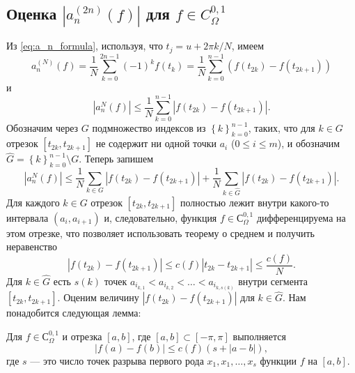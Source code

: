 \subsection{Оценка $|a_{n}^{(2n)}(f)|$ для $f \in C^{0,1}_\Omega$}
Из \eqref{eq:a_n_formula}, используя, что $t_j=u+2\pi k / N$, имеем
\begin{equation*}
a_{n}^{(N)}(f) = \frac{1}{N} \sum_{k=0}^{2n-1} (-1)^k f(t_k)  =
\frac{1}{N} \sum_{k=0}^{n-1} \left(f(t_{2k}) - f(t_{2k+1})\right)
\end{equation*}
и
\begin{equation*}
\left|a_{n}^{N}(f)\right| \leq \frac{1}{N} \sum_{k=0}^{n-1} \left| f(t_{2k}) - f(t_{2k+1}) \right|.
\end{equation*}
Обозначим через $G$ подмножество индексов из $\left\{k\right\}_{k=0}^{n-1}$, таких, что для $k \in G$ отрезок $[t_{2k}, t_{2k+1}]$
не содержит ни одной точки $a_i$ ($0 \leq i \leq m$), и обозначим
$\hat{G} = \left\{k\right\}_{k=0}^{n-1} \setminus G$.
Теперь запишем
\begin{equation}\label{ak_estimate}
\left|a_{n}^{N}(f)\right| \leq \frac{1}{N} \sum_{k \in G} \left| f(t_{2k}) - f(t_{2k+1}) \right| + \frac{1}{N} \sum_{k \in \hat{G}} \left| f(t_{2k}) - f(t_{2k+1}) \right|.
\end{equation}
Для каждого $k \in G$ отрезок $[t_{2k}, t_{2k+1}]$ полностью лежит внутри какого-то интервала $(a_i, a_{i+1})$ и, следовательно, функция $f \in С^{0,1}_\Omega$ дифференцируема на этом отрезке, что позволяет использовать теорему о среднем и получить неравенство
\begin{equation} \label{ftk_G_estimate}
\left| f(t_{2k}) - f(t_{2k+1}) \right| \leq c(f) \left| t_{2k} - t_{2k+1} \right| \leq \frac{c(f)}{N}.
\end{equation}
Для $k \in \hat{G}$ есть $s(k)$ точек $a_{i_{k,1}} < a_{i_{k,2}} < \ldots < a_{i_{k,s(k)}}$ внутри сегмента $[t_{2k}, t_{2k+1}]$.
Оценим величину $\left|f(t_{2k}) - f(t_{2k+1})\right|$ для $k \in \hat{G}$.
Нам понадобится следующая лемма:
\begin{lemma}
	Для $f \in С^{0,1}_\Omega$ и отрезка $[a,b]$, где  $[a,b] \subset [-\pi, \pi]$ выполняется
	\begin{equation*}
		\left|f(a) - f(b)\right| \leq c(f)(s + |a - b|),
	\end{equation*}
	где
	$s$ --- это число точек разрыва первого рода $x_1,x_1,\ldots, x_s$ функции $f$ на $[a,b]$.
\end{lemma}
